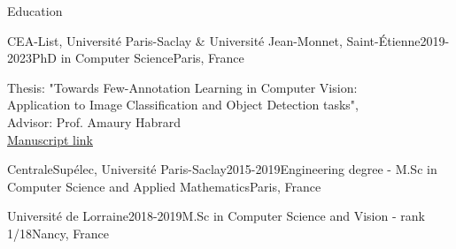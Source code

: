 \documentclass{resume} %
\begin{document}
\vspace{-15pt}

\begin{rSection}{Education}

\begin{rSubsection}{CEA-List, Université Paris-Saclay \& Université Jean-Monnet, Saint-Étienne}{2019-2023}{PhD in Computer Science}{Paris, France}
    \item[] Thesis: "Towards Few-Annotation Learning in Computer Vision:\\ Application to Image Classification and Object Detection tasks",\\ Advisor: Prof. Amaury Habrard \\ \href{https://arxiv.org/abs/2311.04888}{Manuscript link}
    
\end{rSubsection}


\begin{rSubsection}{CentraleSupélec, Université Paris-Saclay}{2015-2019}{Engineering degree - M.Sc in Computer Science and Applied Mathematics}{Paris, France}
    \item[] 
    \vspace{-15pt}
\end{rSubsection}


\begin{rSubsection}{Université de Lorraine}{2018-2019}{M.Sc in Computer Science and Vision - rank 1/18}{Nancy, France}
    \item[] 
    \vspace{-15pt}
\end{rSubsection}


\end{rSection}
\end{document}
